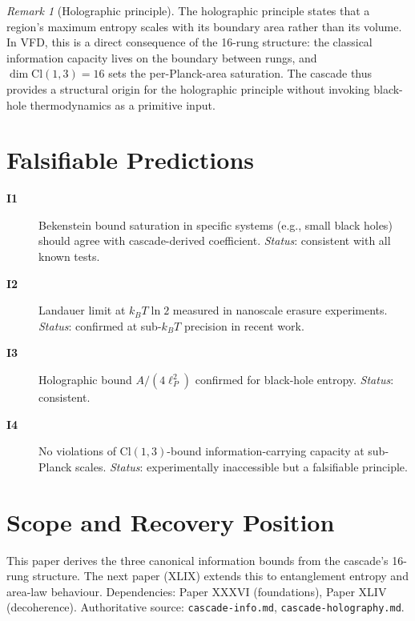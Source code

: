 \documentclass[12pt]{article}
\theoremstyle{remark}
\newtheorem{remark}[theorem]{Remark}
\begin{document}
\begin{remark}[Holographic principle]
The holographic principle states that a region's maximum entropy scales with its boundary area rather than its volume. In VFD, this is a direct consequence of the 16-rung structure: the classical information capacity lives on the boundary between rungs, and $\dim \mathrm{Cl}(1,3) = 16$ sets the per-Planck-area saturation. The cascade thus provides a structural origin for the holographic principle without invoking black-hole thermodynamics as a primitive input.
\end{remark}

\section{Falsifiable Predictions}\label{sec:predictions}

\begin{description}
\item[\textbf{I1}] Bekenstein bound saturation in specific systems (e.g., small black holes) should agree with cascade-derived coefficient. \emph{Status}: consistent with all known tests.
\item[\textbf{I2}] Landauer limit at $k_B T \ln 2$ measured in nanoscale erasure experiments. \emph{Status}: confirmed at sub-$k_B T$ precision in recent work.
\item[\textbf{I3}] Holographic bound $A/(4\ell_P^2)$ confirmed for black-hole entropy. \emph{Status}: consistent.
\item[\textbf{I4}] No violations of $\mathrm{Cl}(1,3)$-bound information-carrying capacity at sub-Planck scales. \emph{Status}: experimentally inaccessible but a falsifiable principle.
\end{description}

\section{Scope and Recovery Position}\label{sec:scope}

This paper derives the three canonical information bounds from the cascade's 16-rung structure. The next paper (XLIX) extends this to entanglement entropy and area-law behaviour. Dependencies: Paper XXXVI (foundations), Paper XLIV (decoherence). Authoritative source: \texttt{cascade-info.md}, \texttt{cascade-holography.md}.
\end{document}
